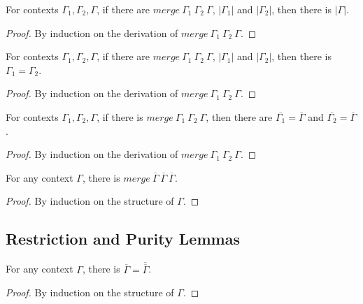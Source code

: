 \documentclass[sigplan,screen,review,anonymous]{acmart}
\newcommand{\pure}[1]{|#1|}
\newcommand{\mrg}[3]{merge\ {#1}\ {#2}\ {#3}}
\begin{document}
\begin{lemma}\label{mergepurepure}
  For contexts $\Gamma_1, \Gamma_2, \Gamma$, if there are $\mrg{\Gamma_1}{\Gamma_2}{\Gamma}$, $\pure{\Gamma_1}$ and $\pure{\Gamma_2}$, then there is $\pure{\Gamma}$.
\end{lemma}
\begin{proof}
  By induction on the derivation of $\mrg{\Gamma_1}{\Gamma_2}{\Gamma}$.
\end{proof}

\begin{lemma}\label{mergepureeq}
  For contexts $\Gamma_1, \Gamma_2, \Gamma$, if there are $\mrg{\Gamma_1}{\Gamma_2}{\Gamma}$, $\pure{\Gamma_1}$ and $\pure{\Gamma_2}$, then there is $\Gamma_1 = \Gamma_2$.
\end{lemma}
\begin{proof}
  By induction on the derivation of $\mrg{\Gamma_1}{\Gamma_2}{\Gamma}$.
\end{proof}

\begin{lemma}\label{mergerere}
  For contexts $\Gamma_1, \Gamma_2, \Gamma$, if there is $\mrg{\Gamma_1}{\Gamma_2}{\Gamma}$, then there are $\overline{\Gamma_1} = \overline{\Gamma}$ and $\overline{\Gamma_2} = \overline{\Gamma}$.
\end{lemma}
\begin{proof}
  By induction on the derivation of $\mrg{\Gamma_1}{\Gamma_2}{\Gamma}$.
\end{proof}

\begin{lemma}\label{mergererere}
  For any context $\Gamma$, there is $\mrg{\overline{\Gamma}}{\overline{\Gamma}}{\overline{\Gamma}}$.
\end{lemma}
\begin{proof}
  By induction on the structure of $\Gamma$.
\end{proof}

\subsection{Restriction and Purity Lemmas}

\begin{lemma}\label{rere}
  For any context $\Gamma$, there is $\overline{\Gamma} = \overline{\overline{\Gamma}}$.
\end{lemma}
\begin{proof}
  By induction on the structure of $\Gamma$.
\end{proof}
\end{document}
